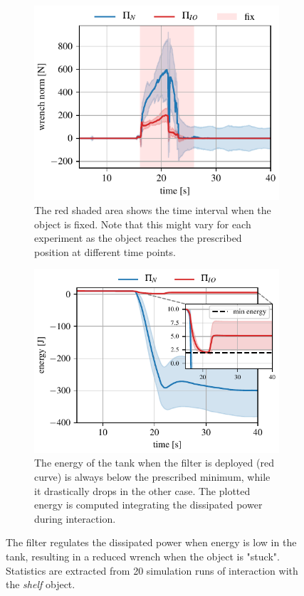\begin{figure}[t]
\centering
\hspace*{-0.0cm} 
\begin{subfigure}{0.8\columnwidth}
    \includegraphics[width=\linewidth]{figures/fix_experiment/wrench_with_without_tank.pdf}
    \caption{The red shaded area shows the time interval when the object is fixed. Note that this might vary for each experiment as the object reaches the prescribed position at different time points.}
\end{subfigure}
\hspace*{-0.0cm} 
\begin{subfigure}{0.8\columnwidth}
    \includegraphics[width=\linewidth]{figures/fix_experiment/energy_with_without_tank.pdf}
    \caption{The energy of the tank when the filter is deployed (red curve) is always below the prescribed minimum, while it drastically drops in the other case. The plotted energy is computed integrating the dissipated power during interaction.}
\end{subfigure}
\hfill
\caption{The filter regulates the dissipated power when energy is low in the tank, resulting in a reduced wrench when the object is "stuck". Statistics are extracted from 20 simulation runs of interaction with the \textit{shelf} object.}\label{fig:tank_comparison}
\end{figure}

